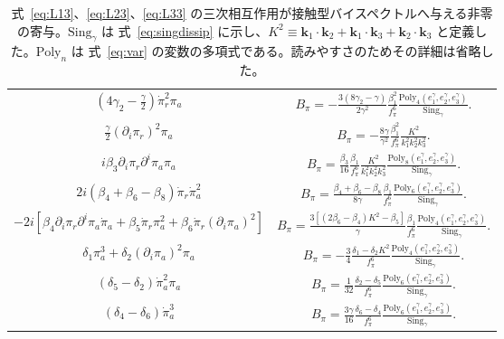 \documentclass[a4paper,11pt]{ltjsarticle}
\numberwithin{equation}{section}
\def\pia{\pi_{a}}
\def\pir{\pi_{r}}
\newcommand{\boldmathsymbol}[1]{{\ensuremath{\boldsymbol{#1}}}}
\newcommand{\bmk}{\boldmathsymbol{k}}
\newcommand{\Eq}[1]{Eq.~(\ref{#1})}
\newcommand{\Eqs}[1]{Eqs.~(\ref{#1})}
\def\bmk{{\boldsymbol{k}}}
\renewcommand{\Eq}[1]{式~\eqref{#1}}
\renewcommand{\Eqs}[1]{式~\eqref{#1}}
\begin{document}
\begin{table}
\centering
\begin{tabular}{cc}
     $\left(4 \gamma_2 -\frac{\gamma}{2} \right)  \dot{\pi}^2_{r} \pia$ & $B_\pi =  -  \frac{3\left(8 \gamma_2 - \gamma  \right)}{2\gamma^2} \frac{\beta_1^2}{f_\pi^6 } \frac{  \mathrm{Poly}_4\left(e_1^\gamma, e_2^\gamma,e_3^\gamma \right)}{ \mathrm{Sing}_\gamma} \Bigg.$ \\
    $\frac{\gamma}{2} 	\left(\partial_i \pir \right)^2 \pia $ & $B_\pi = - \frac{8\gamma}{\gamma^2} \frac{\beta_1^2}{f_\pi^6} \frac{K^2}{ k_1^2 k_2^2 k_3^2} \Bigg.$\\
    $i\beta_3 \partial_i \pir  \partial^i \pia \pia$ & $B_\pi = \frac{\beta_3}{16} \frac{\beta_1}{f_\pi^6}  \frac{K^2}{k_1^2 k_2^2 k_3^2} \frac{  \mathrm{Poly}_8\left(e_1^\gamma, e_2^\gamma,e_3^\gamma \right)}{ \mathrm{Sing}_\gamma}  \Bigg.$ \\
    $2 i\left(\beta_4 + \beta_6 - \beta_8 \right) \dot{\pi}_{r} \dot{\pi}_a^2$ & $B_\pi =   \frac{\beta_4 + \beta_6 - \beta_8}{8\gamma}  \frac{\beta_1}{f_\pi^6} \frac{  \mathrm{Poly}_6\left(e_1^\gamma, e_2^\gamma,e_3^\gamma \right)}{ \mathrm{Sing}_\gamma}  \Bigg.$  \\
    $- 2i \left[\beta_4   \partial_i \pir  \partial^i \pia \dot{\pi}_{a} +  \beta_5   \dot{\pi}_{r}  \pia^2 + \beta_6   \dot{\pi}_{r} (\partial_i \pia)^2\right]$ & $B_\pi = \frac{3\left[\left(2\beta_6 - \beta_4\right)K^2 - \beta_5\right] }{\gamma} \frac{\beta_1}{f_\pi^6}  \frac{  \mathrm{Poly}_4\left(e_1^\gamma, e_2^\gamma,e_3^\gamma \right)}{ \mathrm{Sing}_\gamma}  \Bigg.$  \\ 
    $\delta_1 \pi^3_a + \delta_2 (\partial_i \pia)^2\pia$ & $B_\pi = - \frac{3}{4} \frac{\delta_1 - \delta_2 K^2}{f_\pi^6} \frac{  \mathrm{Poly}_4\left(e_1^\gamma, e_2^\gamma,e_3^\gamma \right)}{ \mathrm{Sing}_\gamma} \Bigg.$\\
    $\left(\delta_5-\delta_2 \right)\dot{\pi}_a^2 \pia $ & $B_\pi = \frac{1}{32} \frac{\delta_2-\delta_5}{f_\pi^6} \frac{  \mathrm{Poly}_6\left(e_1^\gamma, e_2^\gamma,e_3^\gamma \right)}{ \mathrm{Sing}_\gamma} \Bigg.$\\
    $\left(\delta_4-\delta_6 \right)\dot{\pi}_a^3$ & $B_\pi = \frac{3\gamma}{16} \frac{\delta_6-\delta_4}{f_\pi^6} \frac{  \mathrm{Poly}_6\left(e_1^\gamma, e_2^\gamma,e_3^\gamma \right)}{ \mathrm{Sing}_\gamma} \Bigg.$\\
\end{tabular}
\caption{\Eqs{eq:L13}、\eqref{eq:L23}、\eqref{eq:L33} の三次相互作用が接触型バイスペクトルへ与える非零の寄与。$\mathrm{Sing}_\gamma$ は \Eq{eq:singdissip} に示し、$K^2\equiv\bmk_1\cdot\bmk_2+\bmk_1\cdot\bmk_3+\bmk_2\cdot\bmk_3$ と定義した。$\mathrm{Poly}_n$ は \Eq{eq:var} の変数の多項式である。読みやすさのためその詳細は省略した。}
\label{tab:cubicdissip}
\end{table}
\end{document}

